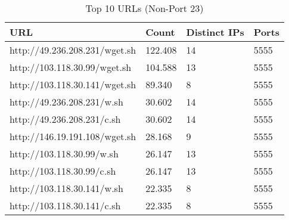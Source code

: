 \begin{table}
\caption{Top 10 URLs (Non-Port 23)}
\label{tab:top10_urls_non_23}
\begin{tabular}{llll}
\toprule
URL & Count & Distinct IPs & Ports \\
\midrule
http://49.236.208.231/wget.sh & 122.408 & 14 & 5555 \\
http://103.118.30.99/wget.sh & 104.588 & 13 & 5555 \\
http://103.118.30.141/wget.sh & 89.340 & 8 & 5555 \\
http://49.236.208.231/w.sh & 30.602 & 14 & 5555 \\
http://49.236.208.231/c.sh & 30.602 & 14 & 5555 \\
http://146.19.191.108/wget.sh & 28.168 & 9 & 5555 \\
http://103.118.30.99/w.sh & 26.147 & 13 & 5555 \\
http://103.118.30.99/c.sh & 26.147 & 13 & 5555 \\
http://103.118.30.141/w.sh & 22.335 & 8 & 5555 \\
http://103.118.30.141/c.sh & 22.335 & 8 & 5555 \\
\bottomrule
\end{tabular}
\end{table}
